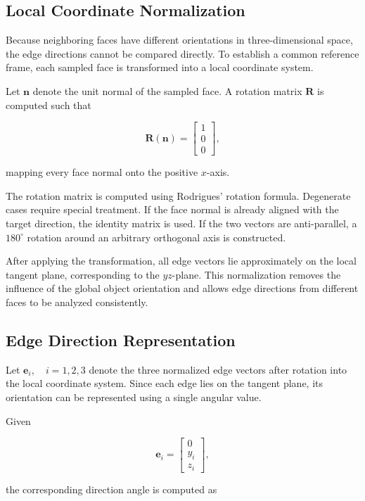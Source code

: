 \documentclass[../main.tex]{subfiles}
\begin{document}
\subsection{Local Coordinate Normalization}

Because neighboring faces have different orientations in three-dimensional space, the edge directions cannot be compared directly. To establish a common reference frame, each sampled face is transformed into a local coordinate system.

Let $\mathbf{n}$ denote the unit normal of the sampled face. A rotation matrix $\mathbf{R}$ is computed such that

\[
\mathbf{R(n)}
=
\begin{bmatrix}
	1\\
	0\\
	0
\end{bmatrix},
\]

mapping every face normal onto the positive $x$-axis.

The rotation matrix is computed using Rodrigues' rotation formula. Degenerate cases require special treatment. If the face normal is already aligned with the target direction, the identity matrix is used. If the two vectors are anti-parallel, a $180^\circ$ rotation around an arbitrary orthogonal axis is constructed.

After applying the transformation, all edge vectors lie approximately on the local tangent plane, corresponding to the $yz$-plane. This normalization removes the influence of the global object orientation and allows edge directions from different faces to be analyzed consistently.

\subsection{Edge Direction Representation}

Let $\mathbf{e}_i,\quad i=1,2,3$ denote the three normalized edge vectors after rotation into the local coordinate system. Since each edge lies on the tangent plane, its orientation can be represented using a single angular value.

Given

\[
\mathbf{e}_i=
\begin{bmatrix}
	0\\
	y_i\\
	z_i
\end{bmatrix},
\]

the corresponding direction angle is computed as
\end{document}
